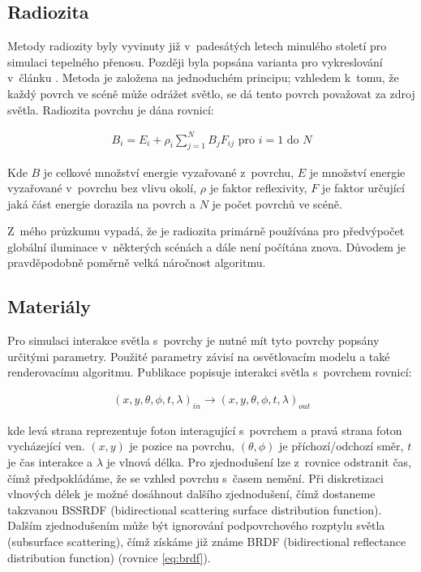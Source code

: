 \subsection{Radiozita}
Metody radiozity byly vyvinuty již v~padesátých letech minulého století pro simulaci tepelného přenosu. Později byla popsána varianta pro vykreslování v~článku \cite{radiosity}. Metoda je založena na jednoduchém principu; vzhledem k~tomu, že každý povrch ve scéně může odrážet světlo, se dá tento povrch považovat za zdroj světla. Radiozita povrchu je dána rovnicí:


\begin{equation} \label{eq:voxel_coords}
	\begin{gathered}
		B_i = E_i + \rho_i \sum^N_{j = 1}B_jF_{ij} \text{ pro } i = 1 \text{ do } N
	\end{gathered}
\end{equation}

Kde $B$ je celkové množství energie vyzařované z~povrchu, $E$ je množství energie vyzařované v~povrchu bez vlivu okolí, $\rho$ je faktor reflexivity, $F$ je faktor určující jaká část energie dorazila na povrch a $N$ je počet povrchů ve scéně.

Z~mého průzkumu vypadá, že je radiozita primárně používána pro předvýpočet globální iluminace v~některých scénách a dále není počítána znova. Důvodem je pravděpodobně poměrně velká náročnost algoritmu.

\subsection{Materiály}
Pro simulaci interakce světla s~povrchy je nutné mít tyto povrchy popsány určitými parametry. Použité parametry závisí na osvětlovacím modelu a také renderovacímu algoritmu. Publikace \cite{materials} popisuje interakci světla s~povrchem rovnicí:

\begin{equation} \label{eq:surface_photon}
	\begin{gathered}
		(x, y, \theta, \phi, t, \lambda)_{in} \xrightarrow{} (x, y, \theta, \phi, t, \lambda)_{out}
	\end{gathered}
\end{equation}

kde levá strana reprezentuje foton interagující s~povrchem a pravá strana foton vycházející ven. $(x, y)$ je pozice na povrchu, $(\theta, \phi)$ je příchozí/odchozí směr, $t$ je čas interakce a $\lambda$ je vlnová délka. Pro zjednodušení lze z~rovnice odstranit čas, čímž předpokládáme, že se vzhled povrchu s~časem nemění. Při diskretizaci vlnových délek je možné dosáhnout dalšího zjednodušení, čímž dostaneme takzvanou BSSRDF (bidirectional scattering surface distribution function). Dalším zjednodušením může být ignorování podpovrchového rozptylu světla (subsurface scattering), čímž získáme již známe BRDF (bidirectional reflectance distribution function) (rovnice \ref{eq:brdf}).

